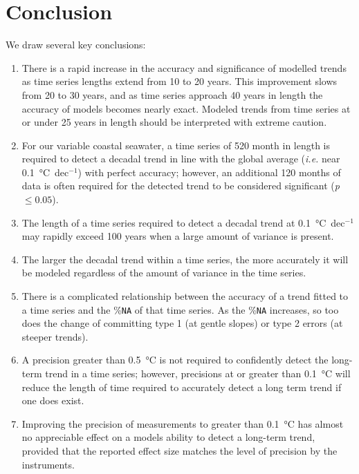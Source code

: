 \documentclass[]{ametsoc}
\begin{document}
\section{Conclusion}
We draw several key conclusions:

\begin{enumerate}
\item There is a rapid increase in the accuracy and significance of modelled trends as time series lengths extend from 10 to 20 years. This improvement slows from 20 to 30 years, and as time series approach 40 years in length the accuracy of models becomes nearly exact. Modeled trends from time series at or under 25 years in length should be interpreted with extreme caution.

\item For our variable coastal seawater, a time series of 520 month in length is required to detect a decadal trend in line with the global average (\emph{i.e.} near \SI{0.1}{\degreeCelsius}~dec$^{-1}$) with perfect accuracy; however, an additional 120 months of data is often required for the detected trend to be considered significant (\emph{p} $\leq 0.05$).

\item The length of a time series required to detect a decadal trend at \SI{0.1}{\degreeCelsius}~dec$^{-1}$ may rapidly exceed 100 years when a large amount of variance is present.

\item The larger the decadal trend within a time series, the more accurately it will be modeled regardless of the amount of variance in the time series.

\item There is a complicated relationship between the accuracy of a trend fitted to a time series and the \%\texttt{NA} of that time series. As the \%\texttt{NA} increases, so too does the change of committing type 1 (at gentle slopes) or type 2 errors (at steeper trends).

\item A precision greater than \SI{0.5}{\degreeCelsius} is not required to confidently detect the long-term trend in a time series; however, precisions at or greater than \SI{0.1}{\degreeCelsius} will reduce the length of time required to accurately detect a long term trend if one does exist.

\item Improving the precision of measurements to greater than \SI{0.1}{\degreeCelsius} has almost no appreciable effect on a models ability to detect a long-term trend, provided that the reported effect size matches the level of precision by the instruments.
\end{enumerate}
\end{document}
